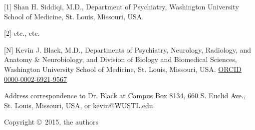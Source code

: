 [1] Shan H. Siddiqi, M.D., Department of Psychiatry, Washington University School of Medicine, St. Louis, Missouri, USA.

[2] etc., etc.

[N] Kevin J. Black, M.D., Departments of Psychiatry, Neurology, Radiology, and Anatomy \& Neurobiology, and Division of Biology and Biomedical Sciences, Washington University School of Medicine, St. Louis, Missouri, USA.  \href{http://orcid.org/0000-0002-6921-9567}{ORCID 0000-0002-6921-9567}

Address correspondence to Dr. Black at Campus Box 8134, 660 S. Euclid Ave., St. Louis, Missouri, USA, or kevin@WUSTL.edu.

Copyright \copyright\, 2015, the authors